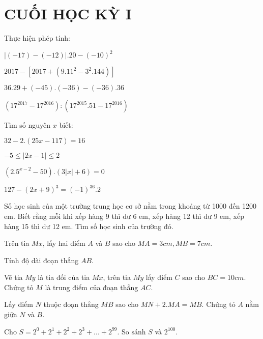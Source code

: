 \section{CUỐI HỌC KỲ I}
\setcounter{ex}{0}
\begin{ex}
	Thực hiện phép tính:
	\begin{listEX}
	\item $\left| \left( -17 \right)-\left( -12 \right) \right|.20-{{\left( -10 \right)}^{2}}$
\item $2017-\left[ 2017+\left( {{9.11}^{2}}-{{3}^{2}}.144 \right) \right]$ 
\item $36.29+\left( -45 \right).\left( -36 \right)-\left( -36 \right).36$
\item $\left( {{17}^{2017}}-{{17}^{2016}} \right):\left( {{17}^{2015}}.51-{{17}^{2016}} \right)$  
	\end{listEX}
\end{ex}
\begin{ex}
	Tìm số nguyên $x$ biết:
	\begin{listEX}[2]
	\item $32-2.\left( 25x-117 \right)=16$
\item $-5\le \left| 2x-1 \right|\le 2$ 
\item $\left( {{2.5}^{x-2}}-50 \right).\left( 3\left| x \right|+6 \right)=0$
\item $127-{{\left( 2x+9 \right)}^{3}}={{\left( -1 \right)}^{36}}.2$ 
	\end{listEX}
\end{ex}
\begin{ex}
	Số học sinh của một trường trung học cơ sở nằm trong khoảng từ 1000 đến 1200 em. Biết rằng mỗi khi xếp hàng 9 thì dư 6 em, xếp hàng 12 thì dư 9 em, xếp hàng 15 thì dư 12 em. Tìm số học sinh của trường đó.
\end{ex}
\begin{ex}
	Trên tia $Mx$, lấy hai điểm $A$ và $B$ sao cho $MA = 3 cm, MB = 7 cm$.
		\begin{listEX}
			\item Tính độ dài đoạn thẳng $AB$.
\item Vẽ tia $My$ là tia đối của tia $Mx$, trên tia $My$ lấy điểm $C$ sao cho $BC = 10 cm$. Chứng tỏ $M$ là trung điểm của đoạn thẳng $AC$.
\item Lấy điểm $N$ thuộc đoạn thẳng $MB$ sao cho 
$MN + 2.MA = MB$. Chứng tỏ $A$ nằm giữa $N$ và $B$.
		\end{listEX}
\end{ex}
\begin{ex}
	Cho $S={{2}^{0}}+{{2}^{1}}+{{2}^{2}}+{{2}^{3}}+...+{{2}^{99}}$. So sánh $S$ và ${{2}^{100}}$.
\end{ex}